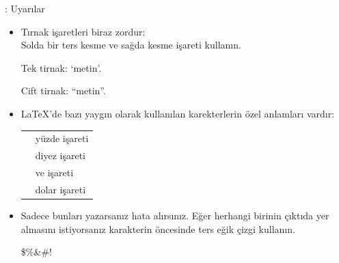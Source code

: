 \documentclass[aspectratio=169]{beamer}
\begin{document}
\begin{frame}[fragile]{\insertsubsection{}: Uyarılar}
\small
\begin{itemize}
\item Tırnak işaretleri biraz zordur:\\
Solda bir ters kesme \keystroke{\`{}} ve sağda kesme işareti \keystroke{\'{}} kullanın.
\begin{exampletwouptiny}
Tek tirnak: `metin'.

Cift tirnak: ``metin''.
\end{exampletwouptiny}

\item \LaTeX'de bazı yaygın olarak kullanılan karekterlerin özel anlamları vardır:\\[1ex]
\begin{tabular}{cl}
\keystrokebftt{\%} & yüzde işareti              \\
\keystrokebftt{\#} & diyez işareti \\
\keystrokebftt{\&} & ve işareti                 \\
\keystrokebftt{\$} & dolar işareti               \\
\end{tabular}
\item Sadece bunları yazarsanız hata alırsınız. Eğer herhangi birinin çıktıda yer almasını istiyorsanız karakterin öncesinde ters eğik çizgi kullanın.
\begin{exampletwoup}
\$\%\&\#!
\end{exampletwoup}
\end{itemize}
\end{frame}
\end{document}
